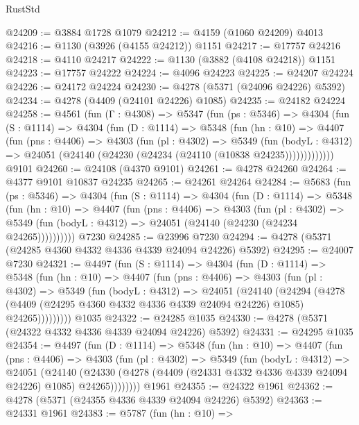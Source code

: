 \begin{lexlean}{RustStd}
\begin{coremodule}
@24209 := @3884 @1728 @1079
@24212 := @4159 (@1060 @24209) @4013
@24216 := @1130 (@3926 (@4155 @24212)) @1151
@24217 := @17757 @24216
@24218 := @4110 @24217
@24222 := @1130 (@3882 (@4108 @24218)) @1151
@24223 := @17757 @24222
@24224 := @4096 @24223
@24225 := @24207 @24224
@24226 := @24172 @24224
@24230 := @4278 (@5371 (@24096 @24226) @5392)
@24234 := @4278 (@4409 (@24101 @24226) @1085)
@24235 := @24182 @24224
@24258 := @4561
    (fun (Γ : @4308) =>
    @5347
      (fun (ps : @5346) =>
      @4304
        (fun (S : @1114) =>
        @4304
          (fun (D : @1114) =>
          @5348
            (fun (hn : @10) =>
            @4407
              (fun (pns : @4406) =>
              @4303
                (fun (pl : @4302) =>
                @5349
                  (fun (bodyL : @4312) =>
                  @24051 (@24140 (@24230 (@24234 (@24110 (@10838 @24235)))))))))))))
    @9101
@24260 := @24108 (@4370 @9101)
@24261 := @4278 @24260
@24264 := @4377 @9101 @10837 @24235
@24265 := @24261 @24264
@24284 := @5683
    (fun (ps : @5346) =>
    @4304
      (fun (S : @1114) =>
      @4304
        (fun (D : @1114) =>
        @5348
          (fun (hn : @10) =>
          @4407
            (fun (pns : @4406) =>
            @4303
              (fun (pl : @4302) =>
              @5349 (fun (bodyL : @4312) => @24051 (@24140 (@24230 (@24234 @24265))))))))))
    @7230
@24285 := @23996 @7230
@24294 := @4278 (@5371 (@24285 @4360 @4332 @4336 @4339 @24094 @24226) @5392)
@24295 := @24007 @7230
@24321 := @4497
    (fun (S : @1114) =>
    @4304
      (fun (D : @1114) =>
      @5348
        (fun (hn : @10) =>
        @4407
          (fun (pns : @4406) =>
          @4303
            (fun (pl : @4302) =>
            @5349
              (fun (bodyL : @4312) =>
              @24051
                (@24140
                  (@24294
                    (@4278
                      (@4409 (@24295 @4360 @4332 @4336 @4339 @24094 @24226) @1085)
                      @24265)))))))))
    @1035
@24322 := @24285 @1035
@24330 := @4278 (@5371 (@24322 @4332 @4336 @4339 @24094 @24226) @5392)
@24331 := @24295 @1035
@24354 := @4497
    (fun (D : @1114) =>
    @5348
      (fun (hn : @10) =>
      @4407
        (fun (pns : @4406) =>
        @4303
          (fun (pl : @4302) =>
          @5349
            (fun (bodyL : @4312) =>
            @24051
              (@24140
                (@24330 (@4278 (@4409 (@24331 @4332 @4336 @4339 @24094 @24226) @1085) @24265))))))))
    @1961
@24355 := @24322 @1961
@24362 := @4278 (@5371 (@24355 @4336 @4339 @24094 @24226) @5392)
@24363 := @24331 @1961
@24383 := @5787
    (fun (hn : @10) =>

\end{coremodule}
\end{lexlean}
